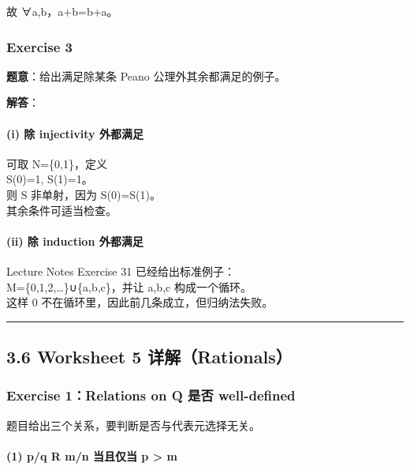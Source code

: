 \documentclass[
  11pt,
]{article}
\begin{document}
故 ∀a,b，a+b=b+a。

\subsubsection{Exercise 3}\label{exercise-3-1}

\textbf{题意}：给出满足除某条 Peano 公理外其余都满足的例子。

\textbf{解答}：

\paragraph{(i) 除 injectivity
外都满足}\label{i-ux9664-injectivity-ux5916ux90fdux6ee1ux8db3}

可取 N=\{0,1\}，定义\\
S(0)=1, S(1)=1。\\
则 S 非单射，因为 S(0)=S(1)。\\
其余条件可适当检查。

\paragraph{(ii) 除 induction
外都满足}\label{ii-ux9664-induction-ux5916ux90fdux6ee1ux8db3}

Lecture Notes Exercise 31 已经给出标准例子：\\
M=\{0,1,2,\ldots\}∪\{a,b,c\}，并让 a,b,c 构成一个循环。\\
这样 0 不在循环里，因此前几条成立，但归纳法失败。

\begin{center}\rule{0.5\linewidth}{0.5pt}\end{center}

\subsection{3.6 Worksheet 5
详解（Rationals）}\label{worksheet-5-ux8be6ux89e3rationals}

\subsubsection{Exercise 1：Relations on Q 是否
well-defined}\label{exercise-1relations-on-q-ux662fux5426-well-defined}

题目给出三个关系，要判断是否与代表元选择无关。

\paragraph{(1) p/q R m/n 当且仅当 p \textgreater{}
m}\label{pq-r-mn-ux5f53ux4e14ux4ec5ux5f53-p-m}
\end{document}
